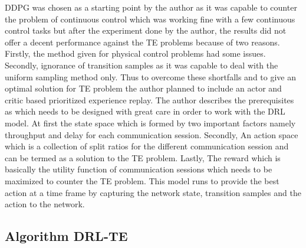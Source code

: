 DDPG \cite{Exp:_DRLapproach} was chosen as a starting point by the author as it was capable to counter the problem of continuous control which was working fine with a few continuous control tasks but after the experiment done by the author, the results did not offer a decent  performance against the TE problems because of two reasons. Firstly, the method given for physical control problems had some issues. Secondly, ignorance of transition samples as it was capable to deal with the uniform sampling method only. Thus to overcome these shortfalls and to give an optimal solution for TE problem the author planned to include an actor and critic based prioritized experience replay. The author describes the prerequisites as \cite{Exp:_DRLapproach}  which needs to be designed with great care in order to work with the DRL model. At first the state space which is formed by two important factors namely throughput and delay for each
communication session. Secondly, An action space which is a collection of split ratios for the different communication session and can be termed as a solution to the TE problem. Lastly, The reward which is basically the utility function of communication sessions which needs to be maximized to counter the TE problem. This model runs to provide the best action at a time frame by capturing the network state, transition samples and the action to the network.

\subsection{Algorithm DRL-TE}
\label{sec:relwork}

